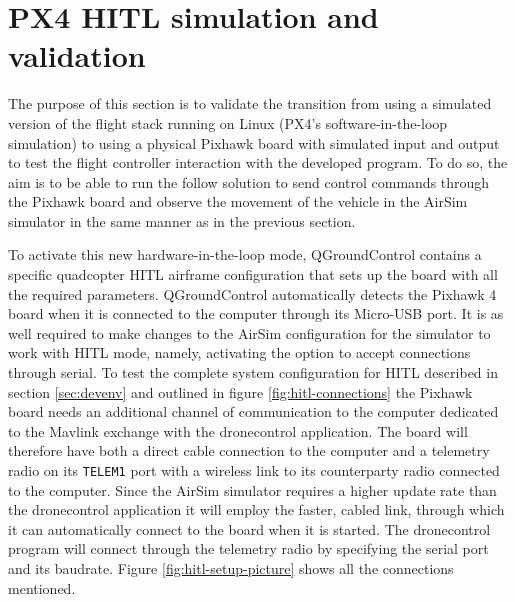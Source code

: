 \section{PX4 HITL simulation and validation}
\label{sec:test-4-hitl}


The purpose of this section is to validate the transition from using a simulated version of the flight stack running on Linux (PX4's software-in-the-loop simulation) to using a physical Pixhawk board with simulated input and output to test the flight controller interaction with the developed program.
To do so, the aim is to be able to run the follow solution to send control commands through the Pixhawk board and observe the movement of the vehicle in the AirSim simulator in the same manner as in the previous section.


To activate this new hardware-in-the-loop mode, QGroundControl contains a specific quadcopter HITL airframe configuration that sets up the board with all the required parameters.
QGroundControl automatically detects the Pixhawk 4 board when it is connected to the computer through its Micro-USB port.
It is as well required to make changes to the AirSim configuration for the simulator to work with HITL mode, namely, activating the option to accept connections through serial.
To test the complete system configuration for HITL described in section \ref{sec:devenv} and outlined in figure \ref{fig:hitl-connections} the Pixhawk board needs an additional channel of communication to the computer dedicated to the Mavlink exchange with the dronecontrol application.
The board will therefore have both a direct cable connection to the computer and a telemetry radio on its \texttt{TELEM1} port with a wireless link to its counterparty radio connected to the computer.
Since the AirSim simulator requires a higher update rate than the dronecontrol application it will employ the faster, cabled link, through which it can automatically connect to the board when it is started.
The dronecontrol program will connect through the telemetry radio by specifying the serial port and its baudrate.
Figure \ref{fig:hitl-setup-picture} shows all the connections mentioned.

